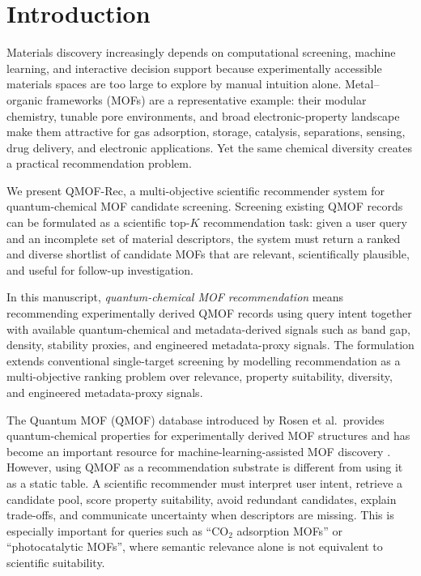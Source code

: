 \documentclass[12pt,a4paper]{article}
\begin{document}
\section{Introduction}
\label{sec:intro}

Materials discovery increasingly depends on computational screening, machine learning, and interactive decision support because experimentally accessible materials spaces are too large to explore by manual intuition alone. Metal--organic frameworks (MOFs) are a representative example: their modular chemistry, tunable pore environments, and broad electronic-property landscape make them attractive for gas adsorption, storage, catalysis, separations, sensing, drug delivery, and electronic applications. Yet the same chemical diversity creates a practical recommendation problem.

We present QMOF-Rec, a multi-objective scientific recommender system for quantum-chemical MOF candidate screening. Screening existing QMOF records can be formulated as a scientific top-$K$ recommendation task: given a user query and an incomplete set of material descriptors, the system must return a ranked and diverse shortlist of candidate MOFs that are relevant, scientifically plausible, and useful for follow-up investigation.

In this manuscript, \emph{quantum-chemical MOF recommendation} means recommending experimentally derived QMOF records using query intent together with available quantum-chemical and metadata-derived signals such as band gap, density, stability proxies, and engineered metadata-proxy signals. The formulation extends conventional single-target screening by modelling recommendation as a multi-objective ranking problem over relevance, property suitability, diversity, and engineered metadata-proxy signals.

The Quantum MOF (QMOF) database introduced by Rosen et al.\ provides quantum-chemical properties for experimentally derived MOF structures and has become an important resource for machine-learning-assisted MOF discovery \cite{rosen2021,rosen2022}. However, using QMOF as a recommendation substrate is different from using it as a static table. A scientific recommender must interpret user intent, retrieve a candidate pool, score property suitability, avoid redundant candidates, explain trade-offs, and communicate uncertainty when descriptors are missing. This is especially important for queries such as ``CO$_2$ adsorption MOFs'' or ``photocatalytic MOFs'', where semantic relevance alone is not equivalent to scientific suitability.
\end{document}
